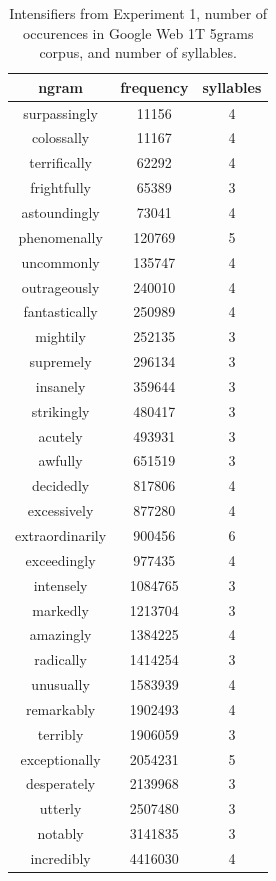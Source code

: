 \documentclass[10pt,letterpaper]{article}
\begin{document}
\begin{table}[ht]
 \begin{center}
  \caption{Intensifiers from Experiment 1, number of occurences in Google Web 1T 5grams corpus, and number of syllables.}
  \label{exp1-intensifiers}
  \begin{tabular}{ccc}
   \hline
   ngram & frequency & syllables \\
    \hline
    surpassingly & 11156 & 4 \\
    colossally & 11167 & 4 \\
    terrifically & 62292 & 4 \\
    frightfully & 65389 & 3 \\
    astoundingly & 73041 & 4 \\
    phenomenally & 120769 & 5 \\
    uncommonly & 135747 & 4 \\
    outrageously & 240010 & 4 \\
    fantastically & 250989 & 4 \\
    mightily & 252135 & 3 \\
    supremely & 296134 & 3 \\
    insanely & 359644 & 3 \\
    strikingly & 480417 & 3 \\
    acutely & 493931 & 3 \\
    awfully & 651519 & 3 \\
    decidedly & 817806 & 4 \\
    excessively & 877280 & 4 \\
    extraordinarily & 900456 & 6 \\
    exceedingly & 977435 & 4 \\
    intensely & 1084765 & 3 \\
    markedly & 1213704 & 3 \\
    amazingly & 1384225 & 4 \\
    radically & 1414254 & 3 \\
    unusually & 1583939 & 4 \\
    remarkably & 1902493 & 4 \\
    terribly & 1906059 & 3 \\
    exceptionally & 2054231 & 5 \\
    desperately & 2139968 & 3 \\
    utterly & 2507480 & 3 \\
    notably & 3141835 & 3 \\
    incredibly & 4416030 & 4 \\

\end{tabular}
\end{center}
\end{table}
\end{document}
